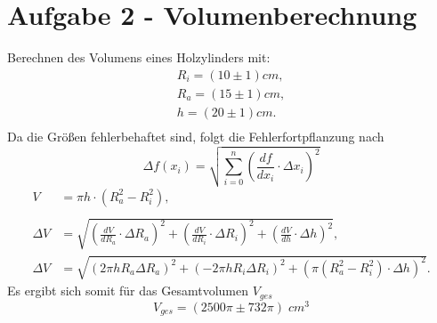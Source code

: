 \section{Aufgabe 2 - Volumenberechnung}
    Berechnen des Volumens eines Holzylinders mit:
    \begin{align*}
        R_{i}=(10 \pm 1) \si{cm},\\
        R_{a}=(15 \pm 1) \si{cm},\\
        h=(20 \pm 1) \si{cm}.\\
    \end{align*}
    Da die Größen fehlerbehaftet sind, folgt die Fehlerfortpflanzung nach
    \begin{equation*}
        \Delta f(x_i)=\sqrt{\sum_{i=0}^n \left(\frac{df}{dx_i}\cdot \Delta x_i \right) ^2}
    \end{equation*}
    \begin{align*}
        V&= \pi h \cdot(R_{a}^2-R_{i}^2),\\\\
        \Delta V &= \sqrt{\left(\frac{dV}{dR_{a}}\cdot \Delta R_{a}\right)^2 + \left(\frac{dV}{dR_{i}}\cdot \Delta R_{i}\right)^2 + \left(\frac{dV}{dh}\cdot \Delta h\right)^2},\\
        \Delta V &= \sqrt{(2 \pi h R_a \Delta R_a)^2 + (-2 \pi h R_i \Delta R_i)^2 + (\pi (R_a^2-R_i^2) \cdot \Delta h)^2} .
    \end{align*}
    Es ergibt sich somit für das Gesamtvolumen $V_{ges}$
    \begin{equation*}
        V_{ges}=(2500\pi \pm 732\pi)\; \si{cm^3}
    \end{equation*}
